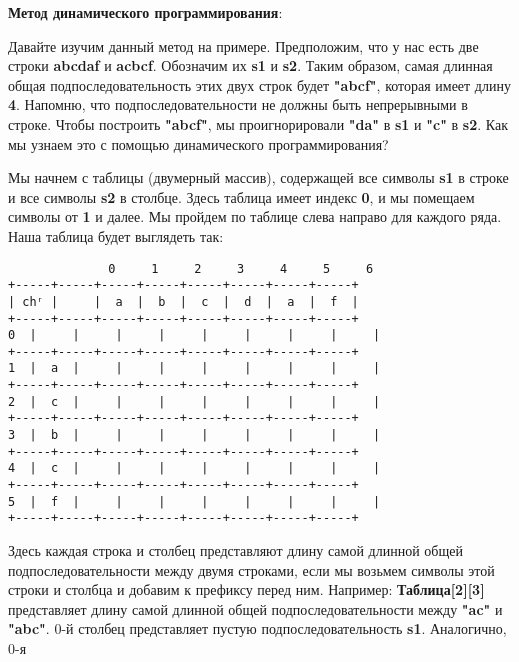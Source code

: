 \textbf{Метод динамического программирования}:
\vspace{\baselineskip}

Давайте изучим данный метод на примере. Предположим, что у нас есть две
строки \textbf{abcdaf} и \textbf{acbcf}. Обозначим их \textbf{s1} и \textbf{s2}. Таким образом, самая длинная
общая подпоследовательность этих двух строк будет \textbf{"abcf"}, которая имеет
длину \textbf{4}. Напомню, что подпоследовательности не должны быть
непрерывными в строке. Чтобы построить \textbf{"abcf"}, мы проигнорировали \textbf{"da"}
в \textbf{s1} и \textbf{"c"} в \textbf{s2}. Как мы узнаем это с помощью динамического
программирования?
\vspace{\baselineskip}

Мы начнем с таблицы (двумерный массив), содержащей все символы \textbf{s1} в
строке и все символы \textbf{s2} в столбце. Здесь таблица имеет индекс \textbf{0}, и мы
помещаем символы от \textbf{1} и далее. Мы пройдем по таблице слева направо для
каждого ряда. Наша таблица будет выглядеть так:
\vspace{\baselineskip}
\begin{tcolorbox}
\begin{verbatim}
              0     1     2     3     4     5     6
+-----+-----+-----+-----+-----+-----+-----+-----+
| chʳ |     |  a  |  b  |  c  |  d  |  a  |  f  |
+-----+-----+-----+-----+-----+-----+-----+-----+
0  |     |     |     |     |     |     |     |     |
+-----+-----+-----+-----+-----+-----+-----+-----+
1  |  a  |     |     |     |     |     |     |     |
+-----+-----+-----+-----+-----+-----+-----+-----+
2  |  c  |     |     |     |     |     |     |     |
+-----+-----+-----+-----+-----+-----+-----+-----+
3  |  b  |     |     |     |     |     |     |     |
+-----+-----+-----+-----+-----+-----+-----+-----+
4  |  c  |     |     |     |     |     |     |     |
+-----+-----+-----+-----+-----+-----+-----+-----+
5  |  f  |     |     |     |     |     |     |     |
+-----+-----+-----+-----+-----+-----+-----+-----+
\end{verbatim}
\end{tcolorbox}
\vspace{\baselineskip}
Здесь каждая строка и столбец представляют длину самой длинной общей
подпоследовательности между двумя строками, если мы возьмем символы
этой строки и столбца и добавим к префиксу перед ним. Например: \textbf{Таблица[2][3]} представляет длину самой длинной общей подпоследовательности
между \textbf{"ac"} и \textbf{"abc"}.
0-й столбец представляет пустую подпоследовательность \textbf{s1}. Аналогично, 0-я
